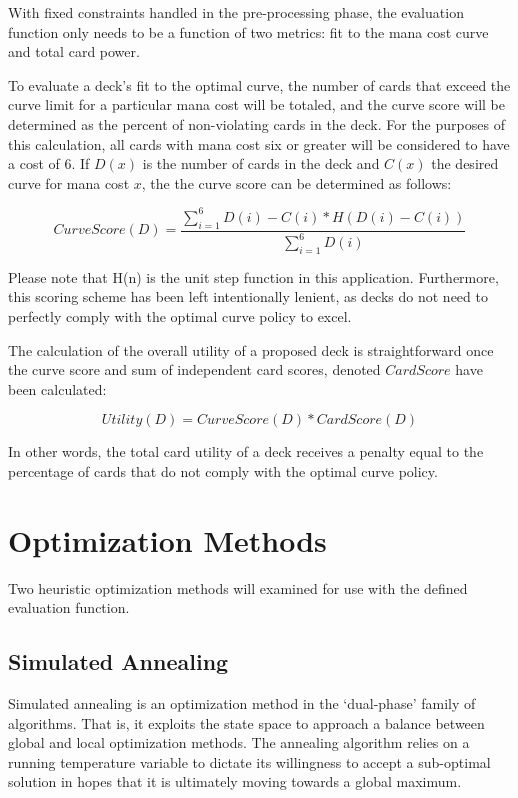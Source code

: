 \documentclass[letterpaper]{article} %
\begin{document}
With fixed constraints handled in the pre-processing phase, the evaluation function only needs to be a function of two metrics: fit to the mana cost curve and total card power.

To evaluate a deck's fit to the optimal curve, the number of cards that exceed the curve limit for a particular mana cost will be totaled, and the curve score will be determined as the percent of non-violating cards in the deck. For the purposes of this calculation, all cards with mana cost six or greater will be considered to have a cost of 6. If $D(x)$ is the number of cards in the deck and $C(x)$ the desired curve for mana cost $x$, the the curve score can be determined as follows:

\begin{equation}
    CurveScore(D) = \frac{\sum_{i=1}^6 D(i)-C(i)*H(D(i)-C(i))}{\sum_{i=1}^6 D(i)}
\end{equation}

Please note that H(n) is the unit step function in this application. Furthermore, this scoring scheme has been left intentionally lenient, as decks do not need to perfectly comply with the optimal curve policy to excel.

The calculation of the overall utility of a proposed deck is straightforward once the curve score and sum of independent card scores, denoted $CardScore$ have been calculated:

\begin{equation}
    Utility(D)=CurveScore(D)*CardScore(D)
\end{equation}

In other words, the total card utility of a deck receives a penalty equal to the percentage of cards that do not comply with the optimal curve policy.

\section{Optimization Methods}

Two heuristic optimization methods will examined for use with the defined evaluation function.

\subsection{Simulated Annealing}

Simulated annealing is an optimization method in the `dual-phase' family of algorithms. That is, it exploits the state space to approach a balance between global and local optimization methods. The annealing algorithm relies on a running temperature variable to dictate its willingness to accept a sub-optimal solution in hopes that it is ultimately moving towards a global maximum.
\end{document}
